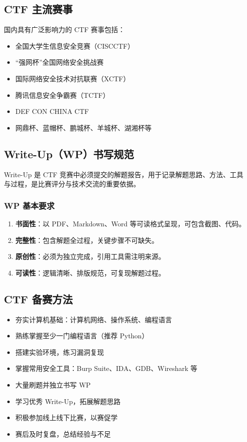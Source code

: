 \subsection{CTF 主流赛事}
国内具有广泛影响力的 CTF 赛事包括：
\begin{itemize}[leftmargin=*]
    \item 全国大学生信息安全竞赛（CISCCTF）
    \item “强网杯”全国网络安全挑战赛
    \item 国际网络安全技术对抗联赛（XCTF）
    \item 腾讯信息安全争霸赛（TCTF）
    \item DEF CON CHINA CTF
    \item 网鼎杯、蓝帽杯、鹏城杯、羊城杯、湖湘杯等
\end{itemize}

\subsection{Write-Up（WP）书写规范}
Write-Up 是 CTF 竞赛中必须提交的解题报告，用于记录解题思路、方法、工具与过程，是比赛评分与技术交流的重要依据。

\subsubsection{WP 基本要求}
\begin{enumerate}[leftmargin=*]
    \item \textbf{书面性}：以 PDF、Markdown、Word 等可读格式呈现，可包含截图、代码。
    \item \textbf{完整性}：包含解题全过程，关键步骤不可缺失。
    \item \textbf{原创性}：必须为独立完成，引用工具需注明来源。
    \item \textbf{可读性}：逻辑清晰、排版规范，可复现解题过程。
\end{enumerate}

\subsection{CTF 备赛方法}
\begin{itemize}[leftmargin=*]
    \item 夯实计算机基础：计算机网络、操作系统、编程语言
    \item 熟练掌握至少一门编程语言（推荐 Python）
    \item 搭建实验环境，练习漏洞复现
    \item 掌握常用安全工具：Burp Suite、IDA、GDB、Wireshark 等
    \item 大量刷题并独立书写 WP
    \item 学习优秀 Write-Up，拓展解题思路
    \item 积极参加线上线下比赛，以赛促学
    \item 赛后及时复盘，总结经验与不足
\end{itemize}

